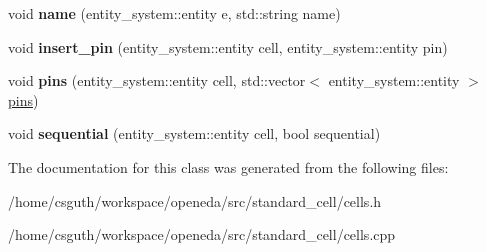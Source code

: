 \begin{DoxyCompactItemize}
\item 
\hypertarget{classophidian_1_1standard__cell_1_1cells_af5af893036add19a532efe78cf96c44b}{void {\bfseries name} (entity\-\_\-system\-::entity e, std\-::string name)}\label{classophidian_1_1standard__cell_1_1cells_af5af893036add19a532efe78cf96c44b}

\item 
\hypertarget{classophidian_1_1standard__cell_1_1cells_a4b57ae16546006c179ad3ff2e9776632}{void {\bfseries insert\-\_\-pin} (entity\-\_\-system\-::entity cell, entity\-\_\-system\-::entity pin)}\label{classophidian_1_1standard__cell_1_1cells_a4b57ae16546006c179ad3ff2e9776632}

\item 
\hypertarget{classophidian_1_1standard__cell_1_1cells_a83d38869b64eb9a7165303d2f06c6716}{void {\bfseries pins} (entity\-\_\-system\-::entity cell, std\-::vector$<$ entity\-\_\-system\-::entity $>$ \hyperlink{classophidian_1_1standard__cell_1_1pins}{pins})}\label{classophidian_1_1standard__cell_1_1cells_a83d38869b64eb9a7165303d2f06c6716}

\item 
\hypertarget{classophidian_1_1standard__cell_1_1cells_a162a6f55c5643b5601d162c390de23c4}{void {\bfseries sequential} (entity\-\_\-system\-::entity cell, bool sequential)}\label{classophidian_1_1standard__cell_1_1cells_a162a6f55c5643b5601d162c390de23c4}

\end{DoxyCompactItemize}


The documentation for this class was generated from the following files\-:\begin{DoxyCompactItemize}
\item 
/home/csguth/workspace/openeda/src/standard\-\_\-cell/cells.\-h\item 
/home/csguth/workspace/openeda/src/standard\-\_\-cell/cells.\-cpp\end{DoxyCompactItemize}

